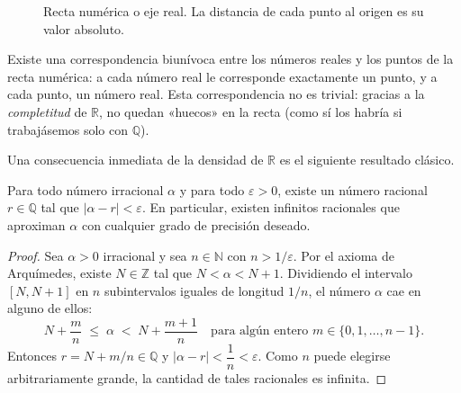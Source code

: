 \begin{figure}[!htbp]
\centering
{}
\caption{Recta numérica o eje real. La distancia de cada punto al origen
es su valor absoluto.}
\label{fig:rectanumerica}
\end{figure}

Existe una correspondencia biunívoca entre los números reales y los puntos de
la recta numérica: a cada número real le corresponde exactamente un punto, y a
cada punto, un número real. Esta correspondencia no es trivial: gracias a la
\emph{completitud} de $\mathbb{R}$, no quedan «huecos» en la recta (como sí
los habría si trabajásemos solo con $\mathbb{Q}$).

Una consecuencia inmediata de la densidad de $\mathbb{R}$ es el siguiente
resultado clásico.

\begin{theorem}
\label{thm:densidad}
Para todo número irracional $\alpha$ y para todo $\varepsilon > 0$, existe un
número racional $r \in \mathbb{Q}$ tal que $|\alpha - r| < \varepsilon$. En
particular, existen infinitos racionales que aproximan $\alpha$ con cualquier
grado de precisión deseado.
\begin{proof}
Sea $\alpha > 0$ irracional y sea $n \in \mathbb{N}$ con $n > 1/\varepsilon$.
Por el axioma de Arquímedes, existe $N \in \mathbb{Z}$ tal que
$N < \alpha < N+1$. Dividiendo el intervalo $[N, N+1]$ en $n$ subintervalos
iguales de longitud $1/n$, el número $\alpha$ cae en alguno de ellos:
\[
   N + \frac{m}{n} \;\leq\; \alpha \;<\; N + \frac{m+1}{n}
   \quad \text{para algún entero } m \in \{0,1,\ldots,n-1\}.
\]
Entonces $r = N + m/n \in \mathbb{Q}$ y
$|\alpha - r| < \dfrac{1}{n} < \varepsilon$.
Como $n$ puede elegirse arbitrariamente grande, la cantidad de tales
racionales es infinita.
\end{proof}
\end{theorem}

